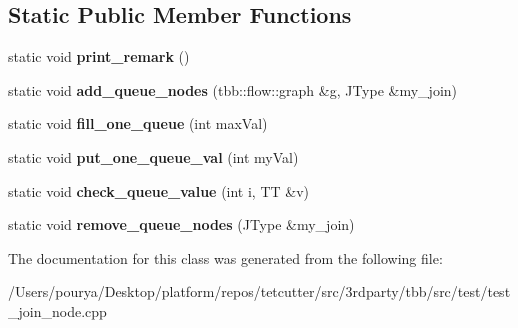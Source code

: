 \subsection*{Static Public Member Functions}
\begin{DoxyCompactItemize}
\item 
\hypertarget{classserial__queue__helper_3_011_00_01JType_01_4_a1e017bba69fd4ccffa8c2bf990aa4e42}{}static void {\bfseries print\+\_\+remark} ()\label{classserial__queue__helper_3_011_00_01JType_01_4_a1e017bba69fd4ccffa8c2bf990aa4e42}

\item 
\hypertarget{classserial__queue__helper_3_011_00_01JType_01_4_ac8893fbb42f7c2876cc3bd1a6b5787ed}{}static void {\bfseries add\+\_\+queue\+\_\+nodes} (tbb\+::flow\+::graph \&g, J\+Type \&my\+\_\+join)\label{classserial__queue__helper_3_011_00_01JType_01_4_ac8893fbb42f7c2876cc3bd1a6b5787ed}

\item 
\hypertarget{classserial__queue__helper_3_011_00_01JType_01_4_a3b3602368a638b667769931ff324c807}{}static void {\bfseries fill\+\_\+one\+\_\+queue} (int max\+Val)\label{classserial__queue__helper_3_011_00_01JType_01_4_a3b3602368a638b667769931ff324c807}

\item 
\hypertarget{classserial__queue__helper_3_011_00_01JType_01_4_a421e3884832ceb9edb9be36b35f75b8f}{}static void {\bfseries put\+\_\+one\+\_\+queue\+\_\+val} (int my\+Val)\label{classserial__queue__helper_3_011_00_01JType_01_4_a421e3884832ceb9edb9be36b35f75b8f}

\item 
\hypertarget{classserial__queue__helper_3_011_00_01JType_01_4_aeedffeec97a4a44e56761e5eb372bd2c}{}static void {\bfseries check\+\_\+queue\+\_\+value} (int i, T\+T \&v)\label{classserial__queue__helper_3_011_00_01JType_01_4_aeedffeec97a4a44e56761e5eb372bd2c}

\item 
\hypertarget{classserial__queue__helper_3_011_00_01JType_01_4_a7fbf35e23eb4ca92b39a1eb805953486}{}static void {\bfseries remove\+\_\+queue\+\_\+nodes} (J\+Type \&my\+\_\+join)\label{classserial__queue__helper_3_011_00_01JType_01_4_a7fbf35e23eb4ca92b39a1eb805953486}

\end{DoxyCompactItemize}


The documentation for this class was generated from the following file\+:\begin{DoxyCompactItemize}
\item 
/\+Users/pourya/\+Desktop/platform/repos/tetcutter/src/3rdparty/tbb/src/test/test\+\_\+join\+\_\+node.\+cpp\end{DoxyCompactItemize}
